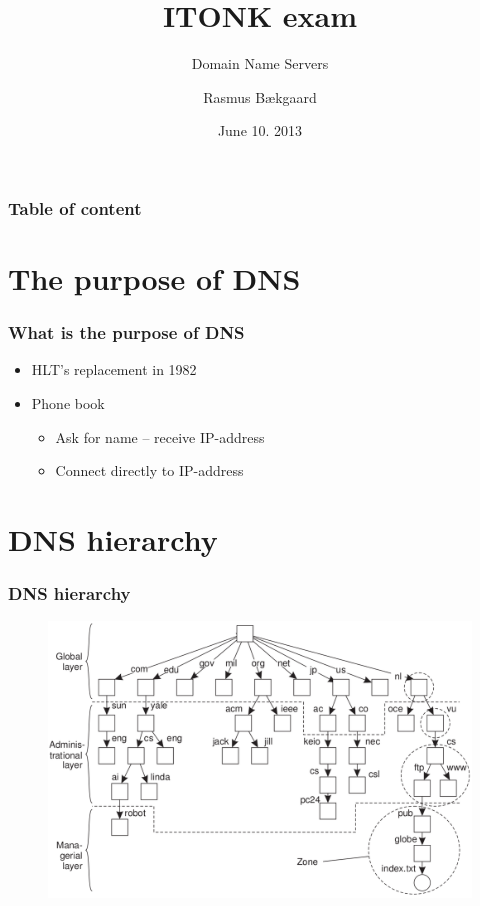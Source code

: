 \documentclass{beamer}
\title{ITONK exam}
\subtitle{Domain Name Servers}
\author %
{Rasmus Bækgaard\inst{1}}
\institute%
{
  \inst{1}%
  Information and Communication Technology\\
  Aarhus University, School of Engineering
}
\date{June 10. 2013}
\begin{document}
\frame{\titlepage}
	
\begin{frame}
	\frametitle{Table of content}
	\tableofcontents%
\end{frame}


\section{The purpose of DNS}
	\begin{frame}
		\frametitle{What is the purpose of DNS}
		
		
			\begin{itemize}
			\item HLT's replacement in 1982
			\item Phone book
			
				\begin{itemize}
				\item Ask for name -- receive IP-address
				\item Connect directly to IP-address
				\end{itemize}
			
			\end{itemize}
		
	\end{frame}
	
\section{DNS hierarchy}
	\begin{frame}
		\frametitle{DNS hierarchy}
		
		\begin{figure}[hbtp]
		\centering
		\includegraphics[scale=0.4]{DNS-hierarki}
		\end{figure}
		
	\end{frame}
	
\end{document}
